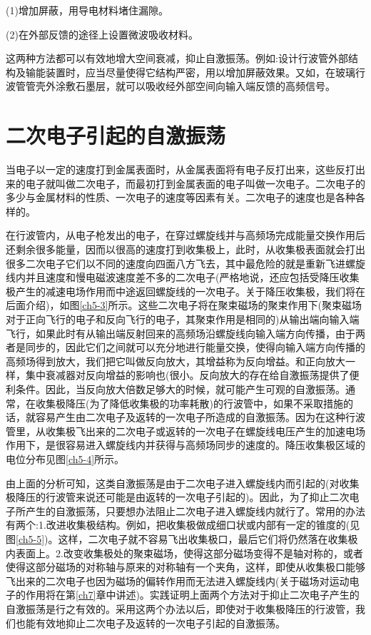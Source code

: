 (1)增加屏蔽，用导电材料堵住漏隙。


(2)在外部反馈的途径上设置微波吸收材料。


这两种方法都可以有效地增大空间衰减，抑止自激振荡。例如:设计行波管外部结构及输能装置时，应当尽量使得它结构严密，用以增加屏蔽效果。又如，在玻璃行波管管壳外涂敷石墨层，就可以吸收经外部空间向输入端反馈的高频信号。
\section{二次电子引起的自激振荡}
当电子以一定的速度打到金属表面时，从金属表面将有电子反打出来，这些反打出来的电子就叫做二次电子，而最初打到金属表面的电子叫做一次电子。二次电子的多少与金属材料的性质、一次电子的速度等因素有关。二次电子的速度也是各种各样的。


在行波管内，从电子枪发出的电子，在穿过螺旋线并与高频场完成能量交换作用后还剩余很多能量，因而以很高的速度打到收集极上，此时，从收集极表面就会打出很多二次电子它们以不同的速度向四面八方飞去，其中最危险的就是重新飞进螺旋线内并且速度和慢电磁波速度差不多的二次电子(严格地说，还应包括受降压收集极产生的减速电场作用而中途返回螺旋线的一次电子。关于降压收集极，我们将在后面介绍)，如图\ref{ch5-3}所示。这些二次电子将在聚束磁场的聚束作用下(聚束磁场对于正向飞行的电子和反向飞行的电子，其聚束作用是相同的)从输出端向输入端飞行，如果此时有从输出端反射回来的高频场沿螺旋线向输入端方向传播，由于两者是同步的，因此它们之间就可以充分地进行能量交换，使得向输入端方向传播的高频场得到放大，我们把它叫做反向放大，其增益称为反向增益。和正向放大一样，集中衰减器对反向增益的影响也(很小。反向放大的存在给自激振荡提供了便利条件。因此，当反向放大倍数足够大的时候，就可能产生可观的自激振荡。通常，在收集极降压(为了降低收集极的功率耗散)的行波管中，如果不采取措施的话，就容易产生由二次电子及返转的一次电子所造成的自激振荡。因为在这种行波管里，从收集极飞出来的二次电子或返转的一次电子在螺旋线电压产生的加速电场作用下，是很容易进入螺旋线内并获得与高频场同步的速度的。降压收集极区域的电位分布见图\ref{ch5-4}所示。


由上面的分析可知，这类自激振荡是由于二次电子进入螺旋线内而引起的(对收集极降压的行波管来说还可能是由返转的一次电子引起的)。因此，为了抑止二次电子所产生的自激振荡，只要想办法阻止二次电子进入螺旋线内就行了。常用的办法有两个:1.改进收集极结构。例如，把收集极做成细口状或内部有一定的锥度的(见图\ref{ch5-5})。这样，二次电子就不容易飞出收集极口，最后它们将仍然落在收集极内表面上。2.改变收集极处的聚束磁场，使得这部分磁场变得不是轴对称的，或者使得这部分磁场的对称轴与原来的对称轴有一个夹角，这样，即使从收集极口能够飞出来的二次电子也因为磁场的偏转作用而无法进入螺旋线内(关于磁场对运动电子的作用将在第\ref{ch7}章中讲述)。实践证明上面两个方法对于抑止二次电子产生的自激振荡是行之有效的。采用这两个办法以后，即使对于收集极降压的行波管，我们也能有效地抑止二次电子及返转的一次电子引起的自激振荡。


